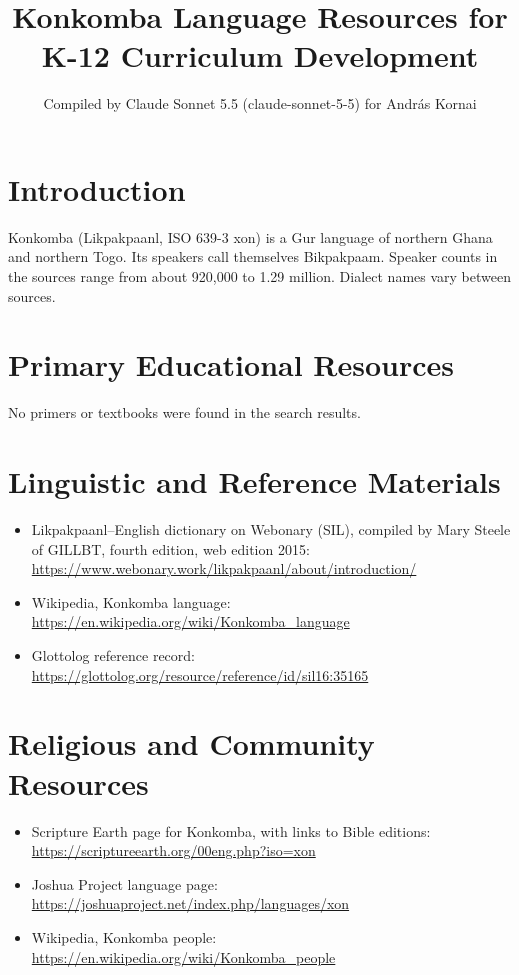 \documentclass[12pt]{article}
\title{Konkomba Language Resources for K-12 Curriculum Development}
\author{Compiled by Claude Sonnet 5.5 (claude-sonnet-5-5) for Andr\'as Kornai}
\date{}
\begin{document}
\maketitle

\section{Introduction}
Konkomba (Likpakpaanl, ISO 639-3 xon) is a Gur language of northern Ghana and northern Togo. Its speakers call themselves Bikpakpaam. Speaker counts in the sources range from about 920,000 to 1.29 million. Dialect names vary between sources.

\section{Primary Educational Resources}
No primers or textbooks were found in the search results.

\section{Linguistic and Reference Materials}
\begin{itemize}
\item Likpakpaanl--English dictionary on Webonary (SIL), compiled by Mary Steele of GILLBT, fourth edition, web edition 2015: \url{https://www.webonary.work/likpakpaanl/about/introduction/}
\item Wikipedia, Konkomba language: \url{https://en.wikipedia.org/wiki/Konkomba_language}
\item Glottolog reference record: \url{https://glottolog.org/resource/reference/id/sil16:35165}
\end{itemize}

\section{Religious and Community Resources}
\begin{itemize}
\item Scripture Earth page for Konkomba, with links to Bible editions: \url{https://scriptureearth.org/00eng.php?iso=xon}
\item Joshua Project language page: \url{https://joshuaproject.net/index.php/languages/xon}
\item Wikipedia, Konkomba people: \url{https://en.wikipedia.org/wiki/Konkomba_people}
\end{itemize}
\end{document}

